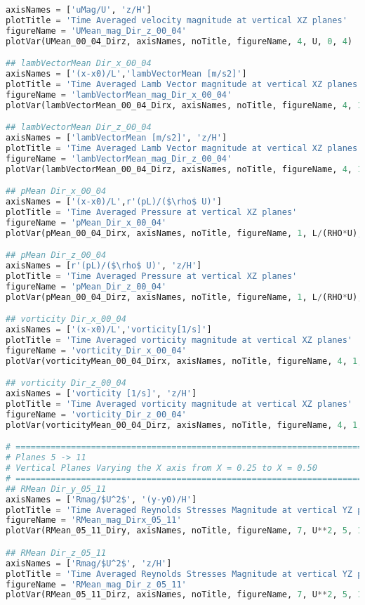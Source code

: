 \begin{lstlisting}[language=python]
axisNames = ['uMag/U', 'z/H']
plotTitle = 'Time Averaged velocity magnitude at vertical XZ planes'
figureName = 'UMean_mag_Dir_z_00_04'
plotVar(UMean_00_04_Dirz, axisNames, noTitle, figureName, 4, U, 0, 4)

## lambVectorMean Dir_x_00_04
axisNames = ['(x-x0)/L','lambVectorMean [m/s2]']
plotTitle = 'Time Averaged Lamb Vector magnitude at vertical XZ planes'
figureName = 'lambVectorMean_mag_Dir_x_00_04'
plotVar(lambVectorMean_00_04_Dirx, axisNames, noTitle, figureName, 4, 1, 0, 4)

## lambVectorMean Dir_z_00_04
axisNames = ['lambVectorMean [m/s2]', 'z/H']
plotTitle = 'Time Averaged Lamb Vector magnitude at vertical XZ planes'
figureName = 'lambVectorMean_mag_Dir_z_00_04'
plotVar(lambVectorMean_00_04_Dirz, axisNames, noTitle, figureName, 4, 1, 0, 4)

## pMean Dir_x_00_04
axisNames = ['(x-x0)/L',r'(pL)/($\rho$ U)']
plotTitle = 'Time Averaged Pressure at vertical XZ planes'
figureName = 'pMean_Dir_x_00_04'
plotVar(pMean_00_04_Dirx, axisNames, noTitle, figureName, 1, L/(RHO*U), 0, 4)

## pMean Dir_z_00_04
axisNames = [r'(pL)/($\rho$ U)', 'z/H']
plotTitle = 'Time Averaged Pressure at vertical XZ planes'
figureName = 'pMean_Dir_z_00_04'
plotVar(pMean_00_04_Dirz, axisNames, noTitle, figureName, 1, L/(RHO*U), 0, 4)

## vorticity Dir_x_00_04
axisNames = ['(x-x0)/L','vorticity[1/s]']
plotTitle = 'Time Averaged vorticity magnitude at vertical XZ planes'
figureName = 'vorticity_Dir_x_00_04'
plotVar(vorticityMean_00_04_Dirx, axisNames, noTitle, figureName, 4, 1, 0, 4)

## vorticity Dir_z_00_04
axisNames = ['vorticity [1/s]', 'z/H']
plotTitle = 'Time Averaged vorticity magnitude at vertical XZ planes'
figureName = 'vorticity_Dir_z_00_04'
plotVar(vorticityMean_00_04_Dirz, axisNames, noTitle, figureName, 4, 1, 0, 4)

# =============================================================================
# Planes 5 -> 11
# Vertical Planes Varying the X axis from X = 0.25 to X = 0.50
# =============================================================================
## RMean Dir_y_05_11
axisNames = ['Rmag/$U^2$', '(y-y0)/H']
plotTitle = 'Time Averaged Reynolds Stresses Magnitude at vertical YZ planes'
figureName = 'RMean_mag_Dirx_05_11'
plotVar(RMean_05_11_Diry, axisNames, noTitle, figureName, 7, U**2, 5, 11)

## RMean Dir_z_05_11
axisNames = ['Rmag/$U^2$', 'z/H']
plotTitle = 'Time Averaged Reynolds Stresses Magnitude at vertical YZ planes'
figureName = 'RMean_mag_Dir_z_05_11'
plotVar(RMean_05_11_Dirz, axisNames, noTitle, figureName, 7, U**2, 5, 11)


\end{lstlisting}
